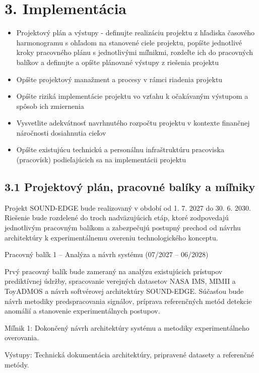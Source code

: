 \documentclass[10pt,a4paper]{article}
\begin{document}
\section*{3. Implementácia}

\begin{itemize}[leftmargin=1.5em,
                itemsep=0pt,
                topsep=2pt]
\item Projektový plán a výstupy - definujte realizáciu projektu z hľadiska časového harmonogramu s ohľadom na stanovené ciele projektu, popíšte jednotlivé kroky pracovného plánu s jednotlivými míľnikmi, rozdeľte ich do pracovných balíkov a definujte a opíšte plánované výstupy z riešenia projektu
\item Opíšte projektový manažment a procesy v rámci riadenia projektu
\item Opíšte riziká implementácie projektu vo vzťahu k očakávaným výstupom a spôsob ich zmiernenia
\item Vysvetlite adekvátnosť navrhnutého rozpočtu projektu v kontexte finančnej náročnosti dosiahnutia cieľov
\item Opíšte existujúcu technickú a personálnu infraštruktúru pracoviska (pracovísk) podieľajúcich sa na implementácii projektu
\end{itemize}

\subsection*{3.1 Projektový plán, pracovné balíky
a míľniky}

Projekt SOUND-EDGE bude realizovaný v období od 1. 7. 2027 do 30. 6. 2030. Riešenie bude rozdelené do troch nadväzujúcich etáp, ktoré zodpovedajú jednotlivým pracovným balíkom a zabezpečujú postupný prechod od návrhu architektúry k experimentálnemu overeniu technologického konceptu.

Pracovný balík 1 – Analýza a návrh systému (07/2027 – 06/2028)

Prvý pracovný balík bude zameraný na analýzu existujúcich prístupov prediktívnej údržby, spracovanie verejných datasetov NASA IMS, MIMII a ToyADMOS a návrh softvérovej architektúry SOUND-EDGE. Súčasťou bude návrh metodiky predspracovania signálov, príprava referenčných metód detekcie anomálií a stanovenie experimentálnych postupov.

Míľnik 1: Dokončený návrh architektúry systému a metodiky experimentálneho overovania.

Výstupy: Technická dokumentácia architektúry, pripravené datasety a referenčné metódy.
\end{document}
